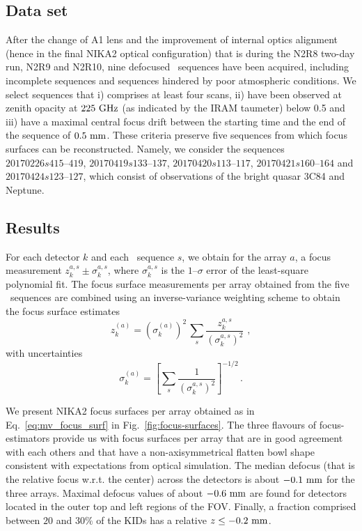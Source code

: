 \subsection{Data set}

After the change of A1 lens and the improvement of internal optics
alignment (hence in the final NIKA2 optical configuration) that is
during the N2R8 two-day run, N2R9 and N2R10,   
nine defocused \bm\ sequences have been acquired, including incomplete
sequences and sequences hindered by poor atmospheric conditions.
We select sequences that i) comprises at least four scans, ii) have been
observed at zenith opacity at $225~\rm{GHz}$ (as indicated by
the IRAM taumeter) below 0.5 and iii) have a maximal central focus
drift between the starting time and the end of the sequence of
$0.5~\rm{mm}$. These criteria preserve five sequences from which focus
surfaces can be reconstructed. Namely, we consider the sequences
$20170226s415\mbox{--}419$, $20170419s133\mbox{--}137$, $20170420s113\mbox{--}117$,
$20170421s160\mbox{--}164$ and $20170424s123\mbox{--}127$, which consist of observations
of the bright quasar 3C84 and Neptune.

\subsection{Results}
For each detector $k$ and each \bm\ sequence $s$, we obtain for
the array $a$, a focus measurement $z_k^{a, s} \pm \sigma_k^{a, s}$,
where $\sigma_k^{a, s}$ is the $1\mbox{--}\sigma$ error of the least-square
polynomial fit. The focus surface measurements per array obtained from the five
\bm\ sequences are combined using an inverse-variance weighting
scheme to obtain the focus surface estimates 
\begin{equation}
\label{eq:mv_focus_surf}
z_k^{(a)} = \left( \sigma_k^{(a)} \right)^2 \,  \sum_s \frac{z_k^{a,s}}{\left(\sigma_k^{a,s}\right)^2}\, \,  ,
\end{equation}
with uncertainties 
\begin{equation}
\label{eq:error_mv_focus_surf}
\sigma_k^{(a)} = \left[ \sum_s \frac{1}{\left(\sigma_k^{a,s}\right)^2}\right]^{-1/2}\, .
\end{equation}


We present NIKA2 focus surfaces per array obtained as in
Eq.~\ref{eq:mv_focus_surf} 
in Fig.~\ref{fig:focus-surfaces}.
The three flavours of focus-estimators provide us with focus surfaces
per array that are in good agreement with each others and that have a
non-axisymmetrical flatten bowl shape consistent with expectations from
optical simulation. %
The median defocus (that is the relative focus w.r.t. the center)
across the detectors is about
$-0.1~\rm{mm}$ for the three arrays. Maximal defocus values of about
$-0.6~\rm{mm}$ are found for detectors located in the outer top and
left regions of the FOV. Finally, a fraction comprised between $20$
and $30\%$ of the KIDs has a relative $z\le -0.2~\rm{mm}$.  

